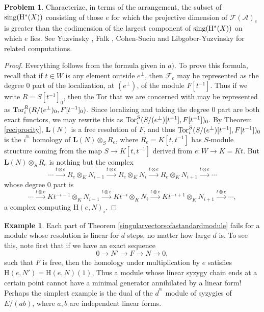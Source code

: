 \documentclass{tran-l}
\theoremstyle{definition}
\newtheorem{example}[theorem]{Example}
\newtheorem{problem}[theorem]{Problem}
\theoremstyle{remark}
\newcommand{\thh}{{^{\mathrm {th}}}}
\newcommand{\Acal}{{{\mathcal A}}}
\newcommand{\LL}{{\mathbf{L}}}
\newcommand{\F}{{\mathcal{F}}}
\newcommand{\sing}{\mathop{\rm sing}\nolimits}
\newcommand{\tor}{\mathop{\rm Tor}\nolimits}
\newcommand{\rH}{{\mathrm H}}
\begin{document}
\begin{problem}
Characterize, in terms of the arrangement,
the subset of $\sing(\rH^*(X))$ consisting
of those $e$ for which the projective dimension of $\F(\Acal)_e$ is
greater than the codimension of the largest component of 
$\sing(\rH^*(X))$ on which $e$ lies. See Yuzvinsky \cite{Yu}, Falk \cite{Fa},
Cohen-Suciu \cite{CS} and Libgober-Yuzvinsky \cite{LY} for related computations. 
\end{problem}

\begin{proof}  Everything follows from the formula given in $a)$.
To prove this formula, recall that if $t\in W$ is any
element outside $e^\perp$, then $\F_e$ may be represented as the
degree $0$ part of the localization, at $(e^\perp)$, 
of the module $F[t^{-1}]$. Thus if we write $R=S[t^{-1}]_0$, then
the Tor that we are concerned with may be represented
as $\tor^R_i(R/(e^\perp)_0, F[t^{-1}]_0)$. Since localizing
and taking the degree 0 part are both exact functors, we
may rewrite this as $\tor^S_i(S/(e^\perp)[t^{-1}], F[t^{-1}])_0$.
By Theorem \ref{reciprocity}, $\LL(N)$ is a free resolution of $F$,
and thus $\tor^S_i(S/(e^\perp)[t^{-1}], F[t^{-1}])_0$ is
the $i^\thh$ homology of $\LL(N)\otimes_S R_e$, where 
$R_e= K[t,t^{-1}]$ has
$S$-module structure coming from the
map $S\to K[t,t^{-1}]$ derived from $e:W\to K=Kt$. 
But $\LL(N)\otimes_S R_e$ is nothing but the complex
\[
\cdots\xrightarrow{t\otimes e}
R_e\otimes_K N_{i-1}\xrightarrow{t\otimes e}
R_e\otimes_K N_{i}\xrightarrow{t\otimes e}
R_e\otimes_K N_{i+1}\xrightarrow{t\otimes e}\cdots
\] 
whose degree 0 part is
\[
\cdots\xrightarrow{t\otimes e}
Kt^{-i-1}\otimes_K N_{i-1}\xrightarrow{t\otimes e}
Kt^{-i}\otimes_K N_{i}\xrightarrow{t\otimes e}
Kt^{-i+1}\otimes_K N_{i+1}\xrightarrow{t\otimes e}\cdots,
\]
a complex computing $\rH(e,N)_i$.
\end{proof}

\begin{example} Each part of Theorem \ref{singularvectorsofastandardmodule} 
fails for a module whose resolution is linear for $d$ steps, no
matter how large $d$ is. To see this,
note first that if we have an exact sequence
\[0\to N'\to F\to N\to 0,\]
such that $F$ is free, then the homology under multiplication by $e$
satisfies $\rH(e,N') = \rH(e,N)(1)$, Thus a module whose
linear syzygy chain ends at a certain point cannot have a
minimal generator annihilated by a linear form! Perhaps the
simplest example is the dual of the $d^\thh$ module of syzygies
of $E/(ab)$, where $a,b$ are independent linear forms.
\end{example}
\end{document}
